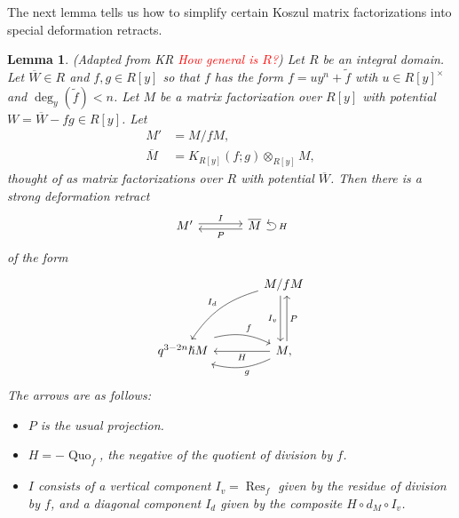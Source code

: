 \documentclass{article}
\DeclareMathOperator{\Res}{Res}
\DeclareMathOperator{\Quo}{Quo}
\newcommand{\sdr}[5]{%
  \begin{tikzcd}[column sep=large, ampersand replacement=\&]
    {#1} \arrow[r, "#3", shift left=0.5ex,] \arrow[r, leftarrow, "#4", shift right=0.5ex, swap] \& 
    {#2} \arrow[loop right, distance=1em, in=15, out=-15, "#5",swap]
  \end{tikzcd}%
}
\theoremstyle{plain} %
\newtheorem{lemma}[theorem]{Lemma}
\theoremstyle{definition} %
\theoremstyle{remark} %
\begin{document}
The next lemma tells us how to simplify certain Koszul matrix factorizations into special deformation retracts.

\begin{lemma}\label{sdrlemma}    (Adapted from KR \textcolor{red}{How general is $R$?}) Let $R$ be an integral domain. Let $\overline W\in R$ and $f,g\in R[y]$ so that $f$ has the form $f=uy^n+\tilde f$ wtih $u\in R[y]^\times$ and $\deg_y(\tilde f)<n$. Let $M$ be a matrix factorization over $R[y]$ with potential $W=\overline W-fg\in R[y]$. Let 
\begin{align*}M'&=M/fM,\\
\overline M &= K_{R[y]}(f;g)\otimes_{R[y]} M,\end{align*}
thought of as matrix factorizations over $R$ with potential $\overline W$.
Then there is a strong deformation retract
$$\sdr{M'}{\overline M}{I}{P}{H}$$
of the form
 $$\begin{tikzcd}[column sep=large, ]
    &M/fM\ar[dd, shift right=0.6ex, "I_v", swap]\ar[dd, leftarrow, shift left=0.6ex, "P"]\arrow[ddl, "I_d", bend right=20, swap]\\\\
    q^{3-2n}\hslash M\arrow[r, "f", shift left=0.5ex, bend left=20]& M\ar[l, "H"]\arrow[l, "g", shift left=0.5ex, bend left=20], 
\end{tikzcd}$$
The arrows are as follows:
\begin{itemize}
    \item $P$ is the usual projection.
    \item $H=-\Quo_f$, the negative of the quotient of division by $f$.
    \item $I$ consists of a vertical component $I_v=\Res_f$ given by the residue of division by $f$, and a diagonal component $I_d$ given by the composite $H\circ d_M\circ I_v$.
\end{itemize}
\end{lemma}
\end{document}
